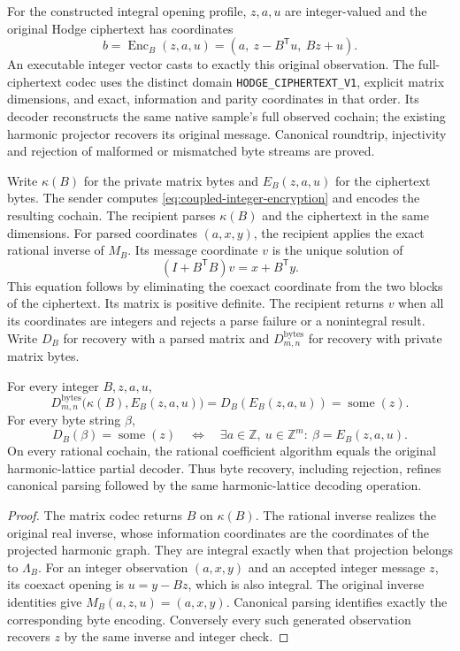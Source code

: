 For the constructed integral opening profile, \(z,a,u\) are integer-valued and
the original Hodge ciphertext has coordinates
\begin{equation}
 b=\operatorname{Enc}_B(z,a,u)=(a,\ z-B^{\mathsf T}u,\ Bz+u).
 \label{eq:coupled-integer-encryption}
\end{equation}
An executable integer vector casts to exactly this original observation. The
full-ciphertext codec uses the distinct domain
\texttt{HODGE\_CIPHERTEXT\_V1}, explicit matrix dimensions, and exact,
information and parity coordinates in that order. Its decoder reconstructs
the same native sample's full observed cochain; the existing harmonic
projector recovers its original message. Canonical roundtrip, injectivity and
rejection of malformed or mismatched byte streams are proved.

Write \(\kappa(B)\) for the private matrix bytes and \(E_B(z,a,u)\) for
the ciphertext bytes. The sender computes \eqref{eq:coupled-integer-encryption}
and encodes the resulting cochain. The recipient parses \(\kappa(B)\) and
the ciphertext in the same dimensions. For parsed coordinates \((a,x,y)\),
the recipient applies the exact rational inverse of \(M_B\). Its message
coordinate \(v\) is the unique solution of
\[
 (I+B^{\mathsf T}B)v=x+B^{\mathsf T}y.
\]
This equation follows by eliminating the coexact coordinate from the two
blocks of the ciphertext. Its matrix is positive definite. The recipient
returns \(v\) when all its coordinates are integers and rejects a parse
failure or a nonintegral result. Write \(D_B\) for recovery with a parsed
matrix and \(D_{m,n}^{\mathrm{bytes}}\) for recovery with private matrix bytes.

\begin{proposition}
\label{prop:coupled-byte-recovery}
For every integer \(B,z,a,u\),
\[
 D_{m,n}^{\mathrm{bytes}}\bigl(\kappa(B),E_B(z,a,u)\bigr)
 =D_B(E_B(z,a,u))=\operatorname{some}(z).
\]
For every byte string \(\beta\),
\[
 D_B(\beta)=\operatorname{some}(z)
 \quad\Longleftrightarrow\quad
 \exists a\in\mathbb Z,\ u\in\mathbb Z^m:\ \beta=E_B(z,a,u).
\]
On every rational cochain, the rational coefficient algorithm equals the
original harmonic-lattice partial decoder. Thus byte recovery, including
rejection, refines canonical parsing followed by the same harmonic-lattice
decoding operation.
\end{proposition}

\begin{proof}
The matrix codec returns \(B\) on \(\kappa(B)\). The rational inverse
realizes the original real inverse, whose information
coordinates are the coordinates of the projected harmonic graph. They are
integral exactly when that projection belongs to \(\Lambda_B\). For an
integer observation \((a,x,y)\) and an accepted integer message \(z\), its
coexact opening is \(u=y-Bz\), which is also integral. The original inverse
identities give \(M_B(a,z,u)=(a,x,y)\). Canonical parsing identifies exactly
the corresponding byte encoding. Conversely every such generated observation
recovers \(z\) by the same inverse and integer check.
\end{proof}

